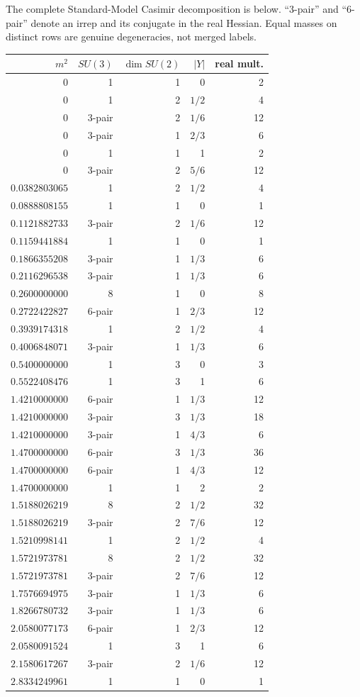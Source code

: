 \documentclass[11pt]{article}
\begin{document}
The complete Standard-Model Casimir decomposition is below.  ``3-pair'' and
``6-pair'' denote an irrep and its conjugate in the real Hessian.  Equal
masses on distinct rows are genuine degeneracies, not merged labels.
\begin{longtable}{@{}rrrrr@{}}
\toprule
$m^2$ & $SU(3)$ & $\dim SU(2)$ & $|Y|$ & real mult.\\
\midrule
\endhead
$0$&1&1&0&2\\
$0$&1&2&$1/2$&4\\
$0$&3-pair&2&$1/6$&12\\
$0$&3-pair&1&$2/3$&6\\
$0$&1&1&1&2\\
$0$&3-pair&2&$5/6$&12\\
$0.0382803065$&1&2&$1/2$&4\\
$0.0888808155$&1&1&0&1\\
$0.1121882733$&3-pair&2&$1/6$&12\\
$0.1159441884$&1&1&0&1\\
$0.1866355208$&3-pair&1&$1/3$&6\\
$0.2116296538$&3-pair&1&$1/3$&6\\
$0.2600000000$&8&1&0&8\\
$0.2722422827$&6-pair&1&$2/3$&12\\
$0.3939174318$&1&2&$1/2$&4\\
$0.4006848071$&3-pair&1&$1/3$&6\\
$0.5400000000$&1&3&0&3\\
$0.5522408476$&1&3&1&6\\
$1.4210000000$&6-pair&1&$1/3$&12\\
$1.4210000000$&3-pair&3&$1/3$&18\\
$1.4210000000$&3-pair&1&$4/3$&6\\
$1.4700000000$&6-pair&3&$1/3$&36\\
$1.4700000000$&6-pair&1&$4/3$&12\\
$1.4700000000$&1&1&2&2\\
$1.5188026219$&8&2&$1/2$&32\\
$1.5188026219$&3-pair&2&$7/6$&12\\
$1.5210998141$&1&2&$1/2$&4\\
$1.5721973781$&8&2&$1/2$&32\\
$1.5721973781$&3-pair&2&$7/6$&12\\
$1.7576694975$&3-pair&1&$1/3$&6\\
$1.8266780732$&3-pair&1&$1/3$&6\\
$2.0580077173$&6-pair&1&$2/3$&12\\
$2.0580091524$&1&3&1&6\\
$2.1580617267$&3-pair&2&$1/6$&12\\
$2.8334249961$&1&1&0&1\\
\bottomrule
\end{longtable}
\end{document}
